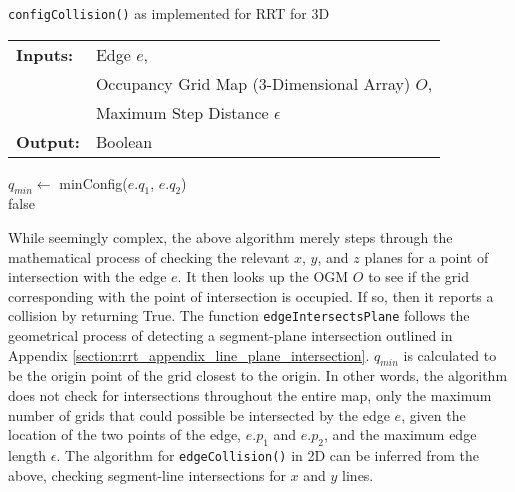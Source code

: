 \begin{algorithm}[ht!]
    \caption{\texttt{configCollision()} as implemented for \gls{RRT} for 3D}
    \SetAlgoLined
    \begin{tabular}{l l}
    \textbf{Inputs:}    & Edge $e$,\\ 
                        & Occupancy Grid Map (3-Dimensional Array) $O$,\\ 
                        & Maximum Step Distance $\epsilon$ \\
    \textbf{Output:}    & Boolean \\
    \end{tabular}
    
        $q_{min} \leftarrow $ minConfig($e.q_1$, $e.q_2$) \\
        \Return false
\end{algorithm}

While seemingly complex, the above algorithm merely steps through the mathematical process of checking the relevant $x$, $y$, and $z$ planes for a point of intersection with the edge $e$. It then looks up the \gls{OGM} $O$ to see if the grid corresponding with the point of intersection is occupied. If so, then it reports a collision by returning True. The function \texttt{edgeIntersectsPlane} follows the geometrical process of detecting a segment-plane intersection outlined in Appendix \ref{section:rrt_appendix_line_plane_intersection}. $q_{min}$ is calculated to be the origin point of the grid closest to the origin. In other words, the algorithm does not check for intersections throughout the entire map, only the maximum number of grids that could possible be intersected by the edge $e$, given the location of the two points of the edge, $e.p_1$ and $e.p_2$, and the maximum edge length $\epsilon$. The algorithm for \texttt{edgeCollision()} in \gls{2D} can be inferred from the above, checking segment-line intersections for $x$ and $y$ lines.
